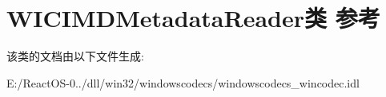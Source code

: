 \hypertarget{class_w_i_c_i_m_d_metadata_reader}{}\section{W\+I\+C\+I\+M\+D\+Metadata\+Reader类 参考}
\label{class_w_i_c_i_m_d_metadata_reader}


该类的文档由以下文件生成\+:\begin{DoxyCompactItemize}
\item 
E\+:/\+React\+O\+S-\/0../dll/win32/windowscodecs/windowscodecs\+\_\+wincodec.\+idl\end{DoxyCompactItemize}

